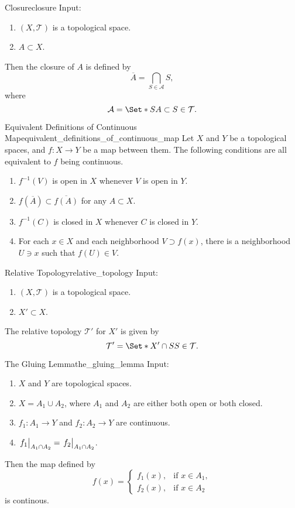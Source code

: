 \documentclass{article}
\begin{document}
\begin{definition}{Closure}{closure}
    Input:
    \begin{enumerate}
        \item $(X,\mathcal{T})$ is a topological space.
        \item $A\subset X$.
    \end{enumerate}
    Then the closure of $A$ is defined by
    \[ \overline{A} = \bigcap_{S\in\mathcal{A}} S, \]
    where
    \[ \mathcal{A} = \Set*{S}{A\subset S\in \mathcal{T}}. \]
\end{definition}

\begin{theorem}{Equivalent Definitions of Continuous Map}{equivalent_definitions_of_continuous_map}
    Let $X$ and $Y$ be a topological spaces, and $f:X\rightarrow Y$ be a map between them.
    The following conditions are all equivalent to $f$ being continuous.
    \begin{enumerate}
        \item $f^{-1}(V)$ is open in $X$ whenever $V$ is open in $Y$.
        \item $f(\overline{A}) \subset \overline{f(A)}$ for any $A\subset X$.
        \item $f^{-1}(C)$ is closed in $X$ whenever $C$ is closed in $Y$.
        \item For each $x\in X$ and each neighborhood $V\supset f(x)$, there is a neighborhood $U\ni x$ such that $f(U) \in V$.
    \end{enumerate}
\end{theorem}

\begin{definition}{Relative Topology}{relative_topology}
    Input:
    \begin{enumerate}
        \item $(X,\mathcal{T})$ is a topological space.
        \item $X'\subset X$.
    \end{enumerate}
    The relative topology $\mathcal{T}'$ for $X'$ is given by
    \[ \mathcal{T}' = \Set*{X'\cap S}{S\in\mathcal{T}}. \]
\end{definition}

\begin{lemma}{The Gluing Lemma}{the_gluing_lemma}
    Input:
    \begin{enumerate}
        \item $X$ and $Y$ are topological spaces.
        \item $X = A_1 \cup A_2$, where $A_1$ and $A_2$ are either both open or both closed.
        \item $f_1:A_1 \rightarrow Y$ and $f_2:A_2\rightarrow Y$ are continuous.
        \item $\eval{f_1}_{A_1\cap A_2} = \eval{f_2}_{A_1\cap A_2}$.
    \end{enumerate}
    Then the map defined by
    \[ f(x) = \begin{cases}
        f_1(x), & \text{if } x\in A_1, \\
        f_2(x), & \text{if } x\in A_2
    \end{cases} \]
    is continous.
\end{lemma}
\end{document}
